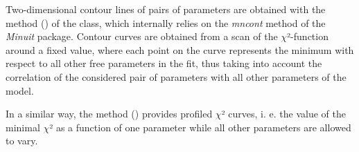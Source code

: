 \documentclass[a4paper,10pt,english]{sphinxmanual}
\begin{document}
Two-dimensional contour lines of pairs of parameters
are obtained with the method {\hyperref[module_doc:kafe.fit.Fit.plot_contour]{\emph{}}} ()
of the  class, which internally relies on the
\emph{mncont} method of the \emph{Minuit} package. Contour curves are
obtained from a scan of the \(\chi\)²-function around a fixed value,
where each point on the curve represents the minimum with
respect to all other free parameters in the fit, thus taking
into account the correlation of the considered pair of parameters
with all other parameters of the model.

In a similar way, the method {\hyperref[module_doc:kafe.fit.Fit.plot_profile]{\emph{}}} ()
provides profiled \(\chi\)² curves, i. e. the value of the minimal
\(\chi\)² as a function of one parameter while all other parameters
are allowed to vary.
\end{document}
